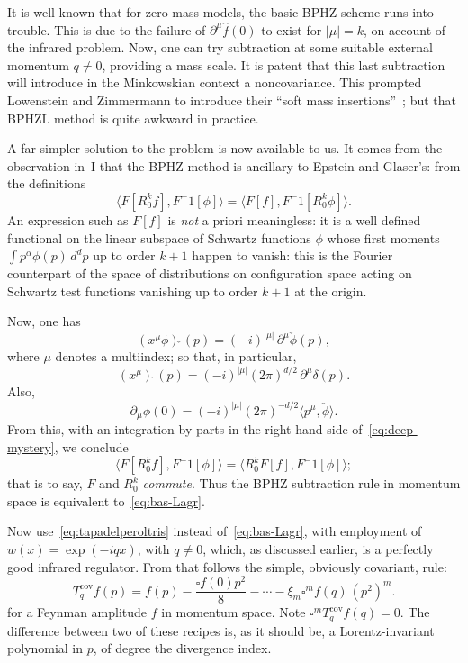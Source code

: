 \documentclass[a4paper,12pt]{article}
\makeatletter
\renewcommand{\a}{\alpha}          %
\newcommand{\cov}{{\mathrm{cov}}}  %
\newcommand{\del}{\partial}        %
\newcommand{\dl}{\delta}           %
\newcommand{\7}{\dagger}           %
\def\<#1,#2>{\langle#1,#2\rangle}  %
\def\section{\@startsection{section}{1}{\z@}{-3.5ex plus -1ex minus
      -.2ex}{2.3ex plus .2ex}{\large\bf}}
\theoremstyle{plain}
\theoremstyle{definition}
\makeatother
\begin{document}
\section{BPHZ interlude}

It is well known that for zero-mass models, the basic BPHZ scheme runs
into trouble. This is due to the failure of $\del^\mu\hat f(0)$ to
exist for $|\mu|=k$, on account of the infrared problem. Now, one can
try subtraction at some suitable external momentum $q\neq0$, providing
a mass scale. It is patent that this last subtraction will introduce
in the Minkowskian context a noncovariance. This prompted Lowenstein
and Zimmermann to introduce their ``soft mass
insertions''~\cite{LowZim}; but that BPHZL method is quite awkward in
practice.

A far simpler solution to the problem is now available to us. It
comes from the observation in~I that the BPHZ method is ancillary to
Epstein and Glaser's: from the definitions
\begin{equation}
\<F[R^k_0f], F^{-1}[\phi]> = \<F[f], F^{-1}[R^k_0\phi]>.
\label{eq:deep-mystery}
\end{equation}
An expression such as $F[f]$ is \textit{not} a priori meaningless: it
is a well defined functional on the linear subspace of Schwartz
functions $\phi$ whose first moments $\int p^\a\phi(p)\,d^d p$ up to
order $k+1$ happen to vanish: this is the Fourier counterpart of the
space of distributions on configuration space acting on Schwartz test
functions vanishing up to order $k+1$ at the origin.

Now, one has
$$
(x^\mu \phi)\check{\ }(p) = (-i)^{|\mu|}\,\del^\mu\check\phi(p),
$$
where $\mu$ denotes a multiindex; so that, in particular,
$$
(x^\mu)\check{\ }(p) = (-i)^{|\mu|} (2\pi)^{d/2}\,\del^\mu\dl(p).
$$
Also,
$$
\del_\mu\phi(0) = (-i)^{|\mu|} (2\pi)^{-d/2} \<p^\mu, \check\phi>.
$$
{}From this, with an integration by parts in the right hand side
of~\eqref{eq:deep-mystery}, we conclude
$$
\<F[R^k_0f], F^{-1}[\phi]> = \<R^k_0 F[f], F^{-1}[\phi]>;
$$
that is to say, $F$ and $R^k_0$ \textit{commute}. Thus the BPHZ
subtraction rule in momentum space is equivalent to~\eqref{eq:bas-Lagr}.

Now use~\eqref{eq:tapadelperoltris} instead of~\eqref{eq:bas-Lagr},
with employment of $w(x)=\exp(-iqx)$, with $q\neq0$, which, as
discussed earlier, is a perfectly good infrared regulator. From that
follows the simple, obviously covariant, rule:
$$
T^\cov_q f(p) =
f(p) - \frac{\square f(0)p^2}{8} -\cdots- \xi_m\square^m f(q)\,(p^2)^m.
$$
for a Feynman amplitude $f$ in momentum space. Note
$\square^m T^\cov_q f(q) = 0$. The difference between two of these
recipes is, as it should be, a Lorentz-invariant polynomial in $p$, of
degree the divergence index.
\end{document}
